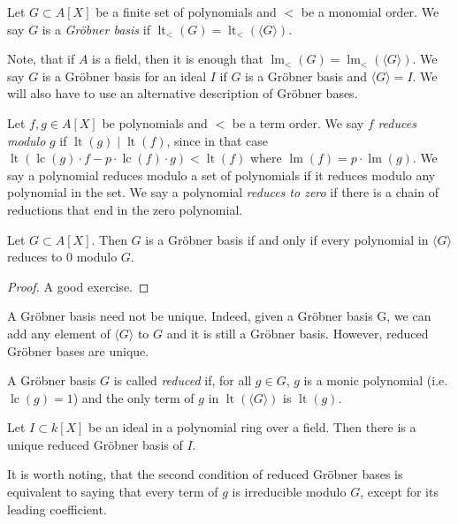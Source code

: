 \documentclass[a4paper, 12pt]{article}
\DeclareMathOperator{\LT}{lt}
\DeclareMathOperator{\LM}{lm}
\DeclareMathOperator{\LC}{lc}
\theoremstyle{changedot}
\theoremstyle{changedotbreak}
\theoremstyle{nonumberplain}
\newtheorem{proof}{Proof}
\begin{document}
\begin{definition}
  Let $G \subset A[X]$ be a finite set of polynomials and $<$ be a monomial order. We say $G$ is a \textit{Gröbner basis} if
  $\LT_{<}(G) = \LT_{<}(\langle G \rangle )$.
\end{definition}

Note, that if $A$ is a field, then it is enough that $\LM_{<}(G) = \LM_{<}(\langle G \rangle)$. We say $G$ is a Gröbner basis for an ideal $I$ if $G$ is a Gröbner basis and $\langle G \rangle = I$. We will also have to use an alternative description of Gröbner bases.

\begin{definition}
  Let $f, g \in A[X]$ be polynomials and $<$ be a term order. We say $f$ \textit{reduces modulo} $g$ if $\LT(g) \mid \LT(f)$, since in that case $\LT(\LC(g)\cdot f - p\cdot \LC(f) \cdot g) < \LT(f)$ where $\LM(f) = p \cdot \LM(g)$. We say a polynomial reduces modulo a set of polynomials if it reduces modulo any polynomial in the set. We say a polynomial \textit{reduces to zero} if there is a chain of reductions that end in the zero polynomial.
\end{definition}

\begin{theorem}\label{thm:grb}
  Let $G \subset A[X]$. Then $G$ is a Gröbner basis if and only if every polynomial in $\langle G \rangle$ reduces to 0 modulo $G$.
\end{theorem}
\begin{proof}
  A good exercise.
\end{proof}

A Gröbner basis need not be unique. Indeed, given a Gröbner basis G, we can add any element of $\langle G \rangle$ to $G$ and it is still a Gröbner basis. However, reduced Gröbner bases are unique.

\begin{definition}
  A Gröbner basis $G$ is called \textit{reduced} if, for all $g \in G$, $g$ is a monic polynomial (i.e. $\LC(g) = 1$) and the only term of $g$ in $\LT(\langle G \rangle)$ is $\LT(g)$.
\end{definition}
\begin{theorem}
  Let $I \subset k[X]$ be an ideal in a polynomial ring over a field. Then there is a unique reduced Gröbner basis of $I$.
\end{theorem}

It is worth noting, that the second condition of reduced Gröbner bases is equivalent to saying that every term of $g$ is irreducible modulo $G$, except for its leading coefficient.
\end{document}
